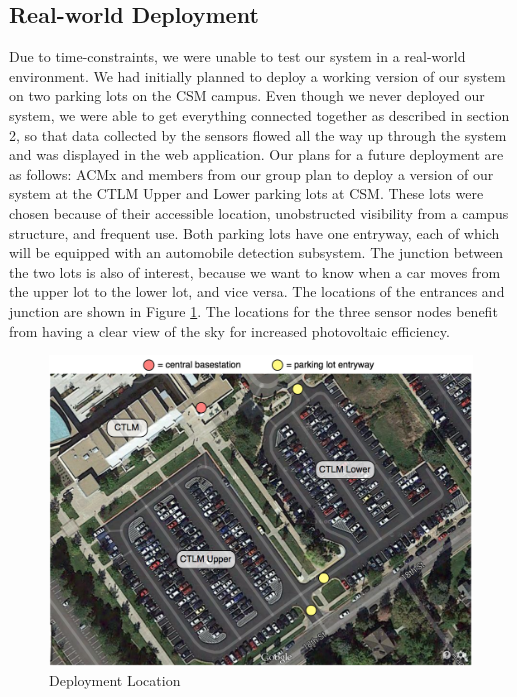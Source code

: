 \documentclass[11pt, oneside, fullpage, doublespace]{article}
\begin{document}
\subsection{Real-world Deployment}
Due to time-constraints, we were unable to test our system in a real-world environment. We had initially planned to deploy a working version of our system on two parking lots on the CSM campus. Even though we never deployed our system, we were able to get everything connected together as described in section 2, so that data collected by the sensors flowed all the way up through the system and was displayed in the web application. Our plans for a future deployment are as follows: ACMx and members from our group plan to deploy a version of our system at the CTLM Upper and Lower parking lots at CSM. These lots were chosen because of their accessible location, unobstructed visibility from a campus structure, and frequent use. Both parking lots have one entryway, each of which will be equipped with an automobile detection subsystem. The junction between the two lots is also of interest, because we want to know when a car moves from the upper lot to the lower lot, and vice versa. The locations of the entrances and junction are shown in Figure \ref{fig:deployment}. The locations for the three sensor nodes benefit from having a clear view of the sky for increased photovoltaic efficiency.
\begin{figure}
\begin{center}
\includegraphics[width=5in]{deployment}
\end{center}
\caption{Deployment Location}
\label{fig:deployment}
\end{figure}
\end{document}
